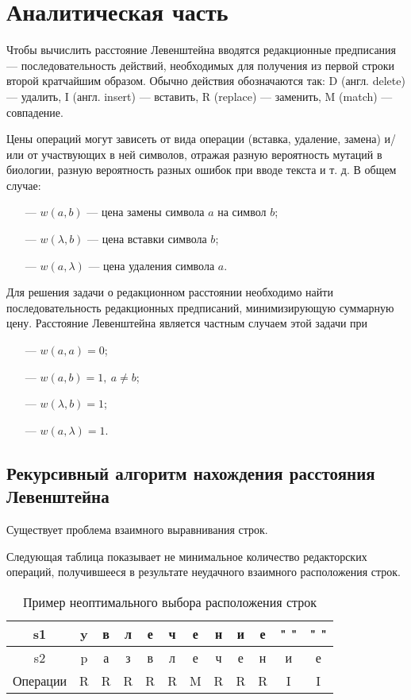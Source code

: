\chapter{Аналитическая часть}

Чтобы вычислить расстояние Левенштейна вводятся редакционные предписания --- последовательность действий, необходимых для получения из первой строки второй кратчайшим образом. Обычно действия обозначаются так: D (англ. delete) --- удалить, I (англ. insert) --- вставить, R (replace) --- заменить, M (match) --- совпадение.

Цены операций могут зависеть от вида операции (вставка, удаление, замена) и/или от участвующих в ней символов, отражая разную вероятность мутаций в биологии, разную вероятность разных ошибок при вводе текста и т. д. В общем случае:
\begin{itemize}
	\item[---] $w(a,b)$ --- цена замены символа $a$ на символ $b$;
	\item[---] $w(\lambda,b)$ --- цена вставки символа $b$;
	\item[---] $w(a,\lambda)$ --- цена удаления символа $a$.
\end{itemize}

Для решения задачи о редакционном расстоянии необходимо найти последовательность редакционных предписаний, минимизирующую суммарную цену. Расстояние Левенштейна является частным случаем этой задачи при
\begin{itemize}
	\item[---] $w(a,a)=0$;
	\item[---] $w(a,b)=1, \medspace a \neq b$;
	\item[---] $w(\lambda,b)=1$;
	\item[---] $w(a,\lambda)=1$.
\end{itemize}

\clearpage

\section{Рекурсивный алгоритм нахождения расстояния Левенштейна}

Существует проблема взаимного выравнивания строк.

Следующая таблица показывает не минимальное количество редакторских операций, получившееся в результате неудачного взаимного расположения строк.

\begin{table}[h]
	\begin{center}
		\caption{\label{tabular:ex} Пример неоптимального выбора расположения строк}
			\begin{tabular}{c|c|c|c|c|c|c|c|c|c|c|c}
				s1 & y & в & л & е & ч & е & н & и & е & " " & " " \\
				\hline
				s2 & p & а & з & в & л & е & ч & е & н & и & е \\
				\hline
				Операции & R & R & R & R & R & M & R & R & R & I & I
			\end{tabular}
	\end{center}
\end{table}

